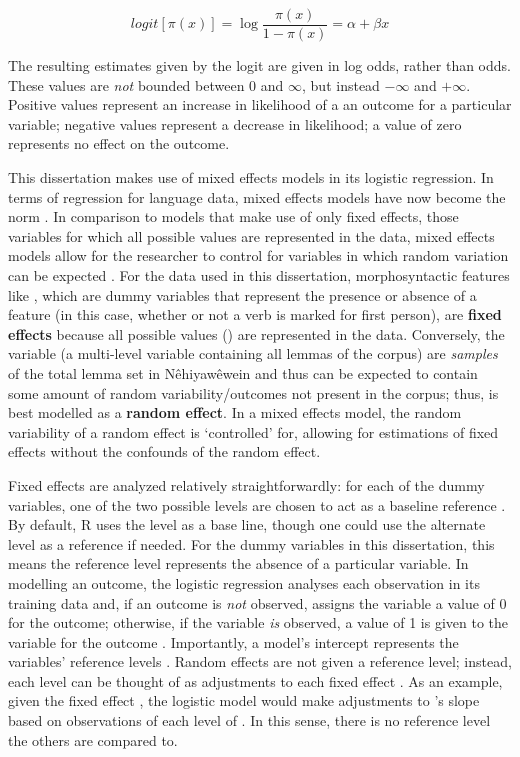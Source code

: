 \begin{equation}
logit[\pi(x)] = \log \frac{\pi(x)}{1-\pi(x)} = \alpha + \beta x
\label{logit}
\end{equation}

The resulting estimates given by the logit are given in log odds, rather than odds. These values are \textit{not} bounded between 0 and $\infty$, but instead $-\infty$ and $+\infty$. Positive values represent an increase in likelihood of a an outcome for a particular variable; negative values represent a decrease in likelihood; a value of zero represents no effect on the outcome. 


This dissertation makes use of mixed effects models in its logistic regression. In terms of regression for language data, mixed effects models have now become the norm \citep[100]{barth2018evaluating}. In comparison to models that make use of only fixed effects, those variables for which all possible values are represented in the data, mixed effects models allow for the researcher to control for variables in which random variation can be expected \citep{baayen2012mixed}. For the data used in this dissertation, morphosyntactic features like , which are dummy variables that represent the presence or absence of a feature (in this case, whether or not a verb is marked for first person), are \textbf{fixed effects} because all possible values () are represented in the data. Conversely, the  variable (a multi-level variable containing all lemmas of the corpus) are \textit{samples} of the total lemma set in Nêhiyawêwein and thus can be expected to contain some amount of random variability/outcomes not present in the corpus; thus,  is best modelled as a \textbf{random effect}. In a mixed effects model, the random variability of a random effect is `controlled' for, allowing for estimations of fixed effects without the confounds of the random effect. 

Fixed effects are analyzed relatively straightforwardly: for each of the dummy variables, one of the two possible levels are chosen to act as a baseline reference \citep{baayen2012mixed}. By default, R uses the  level as a base line, though one could use the alternate level as a reference if needed. For the dummy variables in this dissertation, this means the reference level represents the absence of a particular variable. In modelling an outcome, the logistic regression analyses each observation in its training data and, if an outcome is \textit{not} observed, assigns the variable a value of 0 for the outcome; otherwise, if the variable \textit{is} observed, a value of 1 is given to the variable for the outcome \cite{baayen2012mixed}. Importantly, a model's intercept represents the variables' reference levels \citep{baayen2012mixed}. Random effects are not given a reference level; instead, each level can be thought of as adjustments to each fixed effect \citep{baayen2012mixed}. As an example, given the fixed effect , the logistic model would make adjustments to 's slope based on observations of each level of . In this sense, there is no reference level the others are compared to. 

